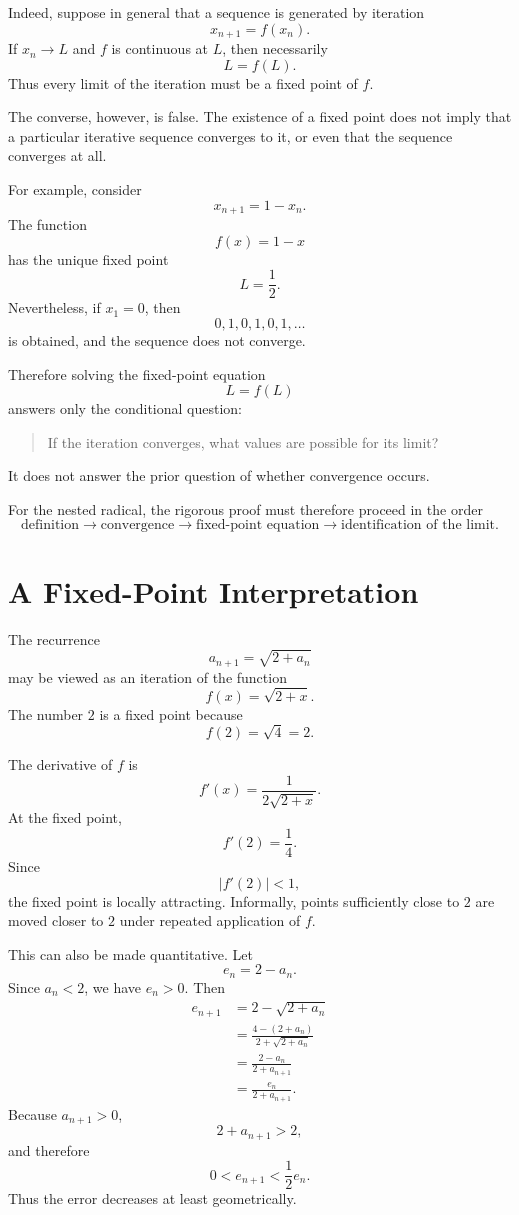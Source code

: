 \documentclass{essay}
\begin{document}
Indeed, suppose in general that a sequence is generated by iteration
\[ x_{n+1}=f(x_{n}). \]
If \(x_{n}\to L\) and \(f\) is continuous at \(L\), then necessarily
\[ L=f(L). \]
Thus every limit of the iteration must be a fixed point of \(f\).

The converse, however, is false. The existence of a fixed point does not imply that a particular iterative sequence converges to it, or even that the sequence converges at all.

For example, consider
\[ x_{n+1}=1-x_{n}. \]
The function
\[ f(x)=1-x \]
has the unique fixed point
\[ L=\frac{1}{2}. \]
Nevertheless, if \(x_{1}=0\), then
\[ 0,1,0,1,0,1,\ldots \]
is obtained, and the sequence does not converge.

Therefore solving the fixed-point equation
\[ L=f(L) \]
answers only the conditional question:

\begin{quote}
  If the iteration converges, what values are possible for its limit?
\end{quote}

It does not answer the prior question of whether convergence occurs.

For the nested radical, the rigorous proof must therefore proceed in the order
\[ \text{definition} \longrightarrow \text{convergence} \longrightarrow \text{fixed-point equation} \longrightarrow \text{identification of the limit}. \]

\section{A Fixed-Point Interpretation}

The recurrence
\[ a_{n+1}=\sqrt{2+a_{n}} \]
may be viewed as an iteration of the function
\[ f(x)=\sqrt{2+x}. \]
The number \(2\) is a fixed point because
\[ f(2)=\sqrt{4}=2. \]

The derivative of \(f\) is
\[ f'(x)=\frac{1}{2\sqrt{2+x}}. \]
At the fixed point,
\[ f'(2)=\frac{1}{4}. \]
Since
\[ |f'(2)|<1, \]
the fixed point is locally attracting. Informally, points sufficiently close to \(2\) are moved closer to \(2\) under repeated application of \(f\).

This can also be made quantitative. Let
\[ e_{n}=2-a_{n}. \]
Since \(a_{n}<2\), we have \(e_{n}>0\). Then
\begin{align*}
  e_{n+1}
  &=
  2-\sqrt{2+a_{n}}\\
  &=
  \frac{4-(2+a_{n})}{2+\sqrt{2+a_{n}}}\\
  &=
  \frac{2-a_{n}}{2+a_{n+1}}\\
  &=
  \frac{e_{n}}{2+a_{n+1}}.
\end{align*}
Because \(a_{n+1}>0\),
\[ 2+a_{n+1}>2, \]
and therefore
\[ 0<e_{n+1}<\frac{1}{2} e_{n}. \]
Thus the error decreases at least geometrically.
\end{document}

